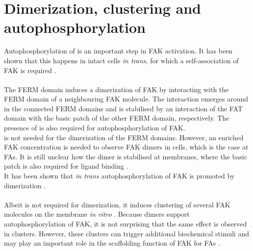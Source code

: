 \section{Dimerization, clustering and autophosphorylation}
\label{intro:clustering}
Autophosphorylation of  is an important step in FAK activation. It has been shown that this happens in intact cells \textit{in trans}, for which a self-association of FAK is required \autocite{transAuto}.\\
\\
The FERM domain induces a dimerization of FAK by interacting with the FERM domain of a neighbouring FAK molecule. The interaction emerges around  in the connected FERM domains and is stabilised by an interaction of the FAT domain with the basic patch of the other FERM domain, respectively. The presence of  is also required for autophosphorylation of FAK.\\
\pip{} is not needed for the dimerization of the FERM domains. However, an enriched FAK concentration is needed to observe FAK dimers in cells, which is the case at FAs. It is still unclear how the dimer is stabilised at membranes, where the basic patch is also required for ligand binding \autocite{fakdimers}.\\
It has been shown that \textit{in trans} autophosphorylation of FAK is promoted by dimerization \autocite{dimersVsClusters}.\\
\\
Albeit \pip{} is not required for dimerization, it induces clustering of several FAK molecules on the membrane \textit{in vitro} \autocite{pap001}. Because dimers support autophosphorylation of FAK, it is not surprising that the same effect is observed in clusters. However, these clusters can trigger additional biochemical stimuli \autocite{dimersVsClusters} and may play an important role in the scaffolding function of FAK for FAs \autocite{pap001}.
